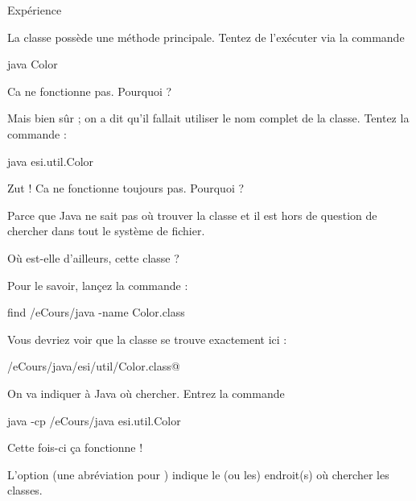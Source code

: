\documentclass[a4paper,11pt]{article}
\begin{document}
			
		\begin{Tutoriel}{Exp\'erience} 
   			\begin{steps}
				
				\item La classe poss\`ede une m\'ethode principale. Tentez de l'ex\'ecuter via la commande
					\begin{Console}
						java Color
					\end{Console}
					
					\par
				
					Ca ne fonctionne pas. Pourquoi ?
			
				\item  Mais bien s\^ur ; on a dit qu'il fallait utiliser le nom complet de la classe.
					Tentez la commande :
					\begin{Console} 
						java esi.util.Color
					\end{Console}
					\par
				
					Zut ! Ca ne fonctionne toujours pas. Pourquoi ?
			
					 Parce que Java ne sait pas o\`u trouver la classe
					et il est hors de question de chercher dans tout le syst\`eme de fichier.
				
            				\par
        
					O\`u est-elle d'ailleurs, cette classe ?
				
            				\par
        
					\item Pour le savoir, lan\c cez la commande :
						\begin{Console} 
							find /eCours/java -name Color.class
						\end{Console}
					Vous devriez voir que la classe se trouve exactement ici :\par
					 \verb@/eCours/java/esi/util/Color.class@
            				\par
        
					\item On va indiquer \`a Java o\`u chercher.
						Entrez la commande
						\begin{Console}
							java -cp /eCours/java esi.util.Color
						\end{Console}
				
					Cette fois-ci \c ca fonctionne !
			
			\end{steps}
		\end{Tutoriel}		
			L'option \verb@cp@ (une abr\'eviation pour \verb@classpath@) indique le (ou les) endroit(s) o\`u chercher les classes.
		
\end{document}
